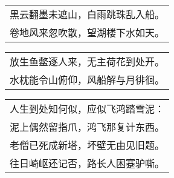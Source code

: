 \nopagebreak%
\nopagebreak%
\noindent\begin{minipage}{\linewidth}
  \vskip-3pt\begin{table}[H]
    \centering
    \begin{tabular}{@{}l@{}}
黑云翻墨未遮山，白雨跳珠乱入船。\\
卷地风来忽吹散，望湖楼下水如天。
    \end{tabular}
  \end{table}
\end{minipage}
\vspace{1cm}


\nopagebreak%
\nopagebreak%
\noindent\begin{minipage}{\linewidth}
  \vskip-3pt\begin{table}[H]
    \centering
    \begin{tabular}{@{}l@{}}
放生鱼鳖逐人来，无主荷花到处开。\\
水枕能令山俯仰，风船解与月徘徊。
    \end{tabular}
  \end{table}
\end{minipage}
\vspace{1cm}


\nopagebreak%
\nopagebreak%
\noindent\begin{minipage}{\linewidth}
  \vskip-3pt\begin{table}[H]
    \centering
    \begin{tabular}{@{}l@{}}
人生到处知何似，应似飞鸿踏雪泥：\\
泥上偶然留指爪，鸿飞那复计东西。\\
老僧已死成新塔，坏壁无由见旧题。\\
往日崎岖还记否，路长人困蹇驴嘶。
    \end{tabular}
  \end{table}
\end{minipage}
\vspace{1cm}


